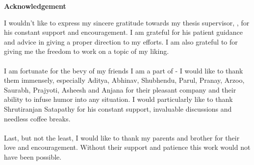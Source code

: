 \begin{center}
	{\huge{\textbf{Acknowledgement}}}
\end{center}
I wouldn't like to express my sincere gratitude towards my thesis supervisor, {\advisormain}, for his constant support and encouragement. I am grateful for his patient guidance and advice in giving a proper direction to my efforts. I am also grateful to {\advisorsec} for giving me the freedom to work on a topic of my liking.

\paragraph*{}
I am fortunate for the bevy of my friends I am a part of - I would like to thank them immensely, especially
Aditya, Abhinav, Shubhendu, Parul, Pranay, Arzoo, Saurabh, Prajyoti, Asheesh and Anjana for their pleasant company and their ability to infuse humor into any situation. I would particularly like to thank Shrutiranjan Satapathy for his constant support, invaluable discussions and needless coffee breaks. 

\paragraph*{}
Last, but not the least, I would like to thank my parents and brother for their love and encouragement. Without their support and patience this work would not have been possible. 

\vskip 4mm
\begin{flushright}
\textit{\textbf{\author}}
\end{flushright}




